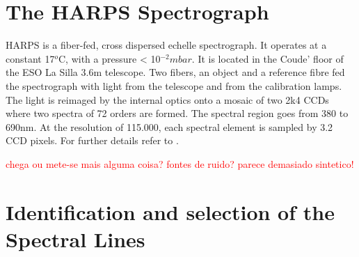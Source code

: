 \documentclass[dvips,12pt,a4paper]{report}
\begin{document}
{\section {The HARPS Spectrograph}


HARPS is a fiber-fed, cross dispersed echelle spectrograph. It operates at a constant 17$^o$C, with a pressure < 10$^{-2}mbar$. It is located in the Coude' floor of the ESO La Silla 3.6m telescope. Two fibers, an object and a reference fibre fed the spectrograph with light from the telescope and from the calibration lamps. The light is reimaged by the internal optics onto a mosaic of two 2k4 CCDs where two spectra of 72 orders are formed. The spectral region goes from 380 to 690nm. At the resolution of 115.000, each spectral element is sampled by 3.2 CCD pixels. For further details refer to \citet{Mayor-2003b}. 

\textcolor{red}{chega ou mete-se mais alguma coisa? fontes de ruido? parece demasiado sintetico!}





\section {Identification and selection of the Spectral Lines}

}
\end{document}
